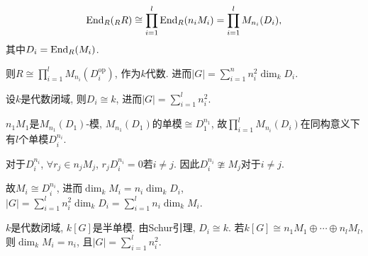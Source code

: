 \begin{proposition}
    $$\operatorname{End}_R(_RR)\cong \prod\limits_{i=1}^l \operatorname{End}_R(n_iM_i)
    =\prod\limits_{i=1}^l M_{n_i}(D_i),$$
    其中$D_i=\operatorname{End}_R(M_i)$. \par
    \qquad 则$R\cong \prod\limits_{i=1}^l M_{n_i}(D_i^{\mathrm{op}})$, 
    作为$k$代数. 进而$|G|=\sum\limits_{i=1}^n n_i^2\dim_k D_i$.
\end{proposition}

\begin{proposition}
    设$k$是代数闭域, 则$D_i\cong k$, 进而$|G|=\sum\limits_{i=1}^l n_i^2$.\par
    \qquad $n_1M_1$是$M_{n_1}(D_1)$-模, $M_{n_1}(D_1)$的单模$\cong D_1^{n_1}$, 
    故$\prod\limits_{i=1}^l M_{n_i}(D_i)$在同构意义下有$l$个单模$D_i^{n_i}$.
\end{proposition}

\begin{proposition}
    对于$D_i^{n_i}$, $\forall r_j\in n_jM_j$, $r_jD_i^{n_i}=0$若$i\neq j$. 
    因此$D_i^{n_i}\ncong M_j$对于$i\neq j$.\par
    \qquad 故$M_i\cong D_i^{n_i}$, 进而$\dim_kM_i=n_i\dim_kD_i$, 
    $|G|=\sum\limits_{i=1}^l n_i^2\dim_k D_i
    =\sum\limits_{i=1}^l n_i \dim_k M_i$.
\end{proposition}

\begin{corollary}
    $k$是代数闭域, $k[G]$是半单模. 由Schur引理, $D_i\cong k$. 
    若$k[G]\cong n_1M_1\oplus \cdots \oplus n_lM_l$, 
    则$\dim_kM_i=n_i$, 且$|G|=\sum\limits_{i=1}^l n_i^2$.
\end{corollary}

